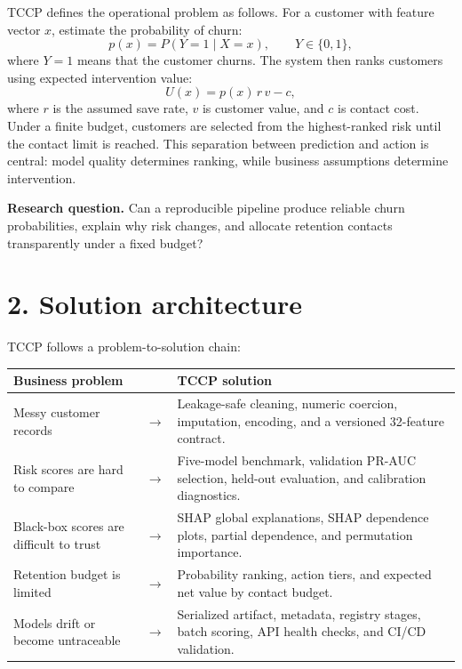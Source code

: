 \documentclass[9pt]{article}
\begin{document}
TCCP defines the operational problem as follows. For a customer with feature vector $x$, estimate the probability of churn:
\begin{equation}
 p(x)=P(Y=1\mid X=x), \qquad Y\in\{0,1\},
\end{equation}
where $Y=1$ means that the customer churns. The system then ranks customers using expected intervention value:
\begin{equation}
 U(x)=p(x)\,r\,v-c,
\end{equation}
where $r$ is the assumed save rate, $v$ is customer value, and $c$ is contact cost. Under a finite budget, customers are selected from the highest-ranked risk until the contact limit is reached. This separation between prediction and action is central: model quality determines ranking, while business assumptions determine intervention.

\textbf{Research question.} Can a reproducible pipeline produce reliable churn probabilities, explain why risk changes, and allocate retention contacts transparently under a fixed budget?

\section*{2. Solution architecture}
TCCP follows a problem-to-solution chain:

\begin{center}
\begin{tabular}{>{\raggedright\arraybackslash}p{} >{\centering\arraybackslash}p{} >{\raggedright\arraybackslash}p{}}
\toprule
\textbf{Business problem} & & \textbf{TCCP solution}\\
\midrule
Messy customer records & $\rightarrow$ & Leakage-safe cleaning, numeric coercion, imputation, encoding, and a versioned 32-feature contract.\\
Risk scores are hard to compare & $\rightarrow$ & Five-model benchmark, validation PR-AUC selection, held-out evaluation, and calibration diagnostics.\\
Black-box scores are difficult to trust & $\rightarrow$ & SHAP global explanations, SHAP dependence plots, partial dependence, and permutation importance.\\
Retention budget is limited & $\rightarrow$ & Probability ranking, action tiers, and expected net value by contact budget.\\
Models drift or become untraceable & $\rightarrow$ & Serialized artifact, metadata, registry stages, batch scoring, API health checks, and CI/CD validation.\\
\bottomrule
\end{tabular}
\end{center}
\end{document}
